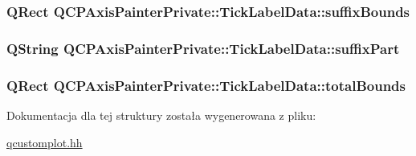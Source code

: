 \subsubsection[{\texorpdfstring{suffix\+Bounds}{suffixBounds}}]{\setlength{\rightskip}{0pt plus 5cm}Q\+Rect Q\+C\+P\+Axis\+Painter\+Private\+::\+Tick\+Label\+Data\+::suffix\+Bounds}\hypertarget{struct_q_c_p_axis_painter_private_1_1_tick_label_data_aa286a44422223bd4f0b044cc822079f6}{}\label{struct_q_c_p_axis_painter_private_1_1_tick_label_data_aa286a44422223bd4f0b044cc822079f6}
\subsubsection[{\texorpdfstring{suffix\+Part}{suffixPart}}]{\setlength{\rightskip}{0pt plus 5cm}Q\+String Q\+C\+P\+Axis\+Painter\+Private\+::\+Tick\+Label\+Data\+::suffix\+Part}\hypertarget{struct_q_c_p_axis_painter_private_1_1_tick_label_data_a3cbf21c6411730a318f8d2287b77d840}{}\label{struct_q_c_p_axis_painter_private_1_1_tick_label_data_a3cbf21c6411730a318f8d2287b77d840}
\subsubsection[{\texorpdfstring{total\+Bounds}{totalBounds}}]{\setlength{\rightskip}{0pt plus 5cm}Q\+Rect Q\+C\+P\+Axis\+Painter\+Private\+::\+Tick\+Label\+Data\+::total\+Bounds}\hypertarget{struct_q_c_p_axis_painter_private_1_1_tick_label_data_afbb3163cf4c628914f1b703945419ea5}{}\label{struct_q_c_p_axis_painter_private_1_1_tick_label_data_afbb3163cf4c628914f1b703945419ea5}


Dokumentacja dla tej struktury została wygenerowana z pliku\+:\begin{DoxyCompactItemize}
\item 
\hyperlink{qcustomplot_8hh}{qcustomplot.\+hh}\end{DoxyCompactItemize}
